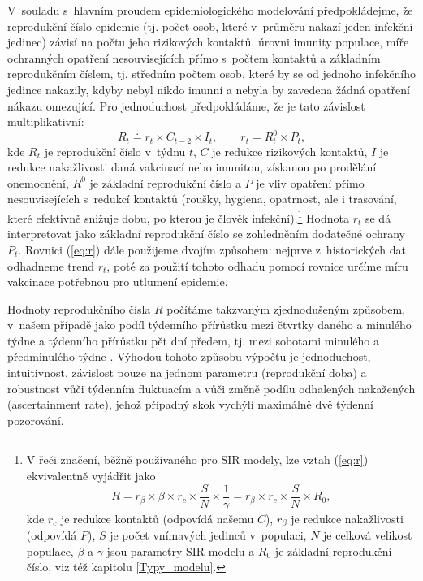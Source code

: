 V~souladu s~hlavním proudem epidemiologického modelování předpokládejme, že reprodukční číslo epidemie (tj. 
počet osob, které v~průměru nakazí jeden infekční jedinec) závisí na počtu jeho
rizikových kontaktů, úrovni imunity populace, míře ochranných opatření
nesouvisejících přímo s~počtem kontaktů a základním reprodukčním
číslem, tj. středním počtem osob, které by se od jednoho infekčního jedince nakazily, kdyby nebyl
nikdo imunní a nebyla by zavedena žádná opatření nákazu omezující. Pro jednoduchost
předpokládáme, že je tato závislost multiplikativní: 
\begin{equation}
R_{t}\doteq r_{t}\times C_{t-2}\times I_{t},\qquad r_{t}=R_{t}^{0}\times P_{t},
\label{eq:r}
\end{equation}
kde $R_{t}$ je reprodukční číslo v~týdnu $t$, $C$ je redukce rizikových kontaktů,
$I$ je redukce nakažlivosti daná vakcinací nebo imunitou, získanou
po prodělání onemocnění, $R^{0}$ je základní reprodukční číslo a
$P$ je vliv opatření přímo nesouvisejících s~redukcí kontaktů (roušky, hygiena, opatrnost, ale i trasování, které efektivně snižuje dobu, po kterou je člověk infekční).\footnote{V řeči značení, běžně používaného pro SIR modely, lze vztah (\ref{eq:r}) ekvivalentně vyjádřit jako 
$$ 
R = r_\beta \times \beta \times r_c \times \frac{S}{N} \times \frac{1}\gamma = r_\beta \times r_c \times \frac{S}{N} \times R_0,
$$
kde $r_c$ je redukce kontaktů (odpovídá našemu $C$), $r_\beta$ je redukce nakažlivosti (odpovídá $P$), $S$ je počet vnímavých jedinců v~populaci, $N$ je celková velikost populace, $\beta$ a $\gamma$ jsou parametry SIR modelu a $R_0$ je základní reprodukční číslo, viz též kapitolu \ref{Typy_modelu}.} Hodnota $r_t$ se dá interpretovat jako základní reprodukční
číslo se zohledněním dodatečné ochrany $P_{t}$. Rovnici (\ref{eq:r}) dále použijeme dvojím způsobem: nejprve z~historických dat odhadneme trend $r_t$, poté za použití tohoto odhadu pomocí rovnice určíme míru vakcinace potřebnou pro utlumení epidemie.

Hodnoty reprodukčního čísla $R$ počítáme takzvaným zjednodušeným způsobem, v~našem případě jako podíl týdenního přírůstku mezi čtvrtky daného a minulého týdne a týdenního přírůstku pět dní předem, tj. mezi sobotami minulého a před\-mi\-nu\-lé\-ho týdne \cite{Rodhad}. Výhodou tohoto způsobu výpočtu je jednoduchost, intuitivnost, závislost pouze na jednom parametru (reprodukční doba) a robustnost vůči týdenním fluktuacím a vůči změně podílu
odhalených nakažených (ascertainment rate), jehož případný skok vychýlí
maximálně dvě týdenní pozorování.

